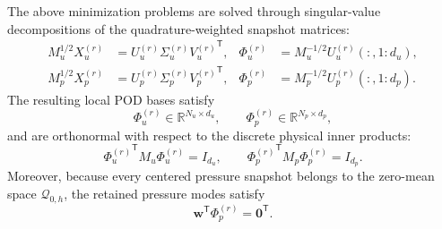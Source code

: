 The above minimization problems are solved through singular-value
decompositions of the quadrature-weighted snapshot matrices:
\begin{align}
M_u^{1/2}X_u^{(r)}
&=
U_u^{(r)}\Sigma_u^{(r)}{V_u^{(r)}}^{\mathsf T},
&
\Phi_u^{(r)}
&=
M_u^{-1/2}U_u^{(r)}(:,1{:}d_u),
\label{eq:weighted_velocity_svd} \\
M_p^{1/2}X_p^{(r)}
&=
U_p^{(r)}\Sigma_p^{(r)}{V_p^{(r)}}^{\mathsf T},
&
\Phi_p^{(r)}
&=
M_p^{-1/2}U_p^{(r)}(:,1{:}d_p).
\label{eq:weighted_pressure_svd}
\end{align}
The resulting local POD bases satisfy
\begin{equation}
\Phi_u^{(r)}
\in
\mathbb{R}^{N_u\times d_u},
\qquad
\Phi_p^{(r)}
\in
\mathbb{R}^{N_p\times d_p},
\label{eq:local_pod_bases}
\end{equation}
and are orthonormal with respect to the discrete physical inner products:
\begin{equation}
{\Phi_u^{(r)}}^{\mathsf T}M_u\Phi_u^{(r)} = I_{d_u},
\qquad
{\Phi_p^{(r)}}^{\mathsf T}M_p\Phi_p^{(r)} = I_{d_p}.
\label{eq:weighted_orthonormality}
\end{equation}
Moreover, because every centered pressure snapshot belongs to the
zero-mean space $\mathcal{Q}_{0,h}$, the retained pressure modes satisfy
\begin{equation}
\boldsymbol{w}^{\mathsf T}\Phi_p^{(r)} = \boldsymbol{0}^{\mathsf T}.
\label{eq:pressure_modes_gauge_consistency}
\end{equation}

